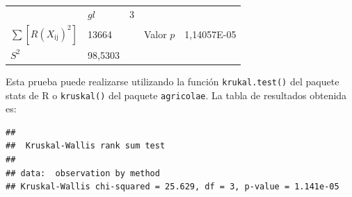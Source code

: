\documentclass[]{book}
\theoremstyle{definition}
\theoremstyle{definition}
\theoremstyle{definition}
\theoremstyle{remark}
\begin{document}
\begin{longtable}[]{@{}lllll@{}}
\begin{minipage}[t]{0.06\columnwidth}
\strut
\end{minipage} & \begin{minipage}[t]{0.11\columnwidth}\raggedright
\(gl\)\strut
\end{minipage} & \begin{minipage}[t]{0.14\columnwidth}\raggedright
3\strut
\end{minipage}\tabularnewline
\begin{minipage}[t]{0.49\columnwidth}\raggedright
\(\sum\left\lbrack R\left( X_{\text{ij}} \right)^{2} \right\rbrack\)\strut
\end{minipage} & \begin{minipage}[t]{0.06\columnwidth}\raggedright
13664\strut
\end{minipage} & \begin{minipage}[t]{0.06\columnwidth}\raggedright
\strut
\end{minipage} & \begin{minipage}[t]{0.11\columnwidth}\raggedright
Valor \(p\)\strut
\end{minipage} & \begin{minipage}[t]{0.14\columnwidth}\raggedright
1,14057E-05\strut
\end{minipage}\tabularnewline
\begin{minipage}[t]{0.49\columnwidth}\raggedright
\(S^{2}\)\strut
\end{minipage} & \begin{minipage}[t]{0.06\columnwidth}\raggedright
98,5303\strut
\end{minipage} & \begin{minipage}[t]{0.06\columnwidth}\raggedright
\strut
\end{minipage} & \begin{minipage}[t]{0.11\columnwidth}\raggedright
\strut
\end{minipage} & \begin{minipage}[t]{0.14\columnwidth}\raggedright
\strut
\end{minipage}\tabularnewline
\bottomrule
\end{longtable}

Esta prueba puede realizarse utilizando la función
\texttt{krukal.test()} del paquete stats de R o \texttt{kruskal()} del
paquete \texttt{agricolae}. La tabla de resultados obtenida es:

\begin{verbatim}
## 
##  Kruskal-Wallis rank sum test
## 
## data:  observation by method
## Kruskal-Wallis chi-squared = 25.629, df = 3, p-value = 1.141e-05
\end{verbatim}
\end{document}
